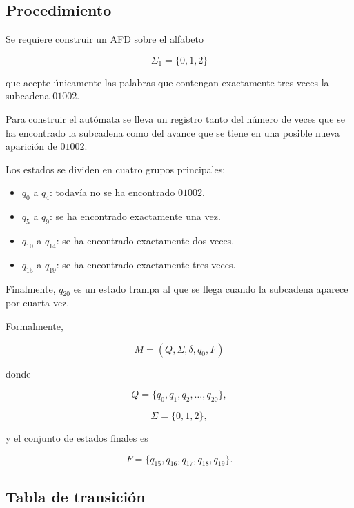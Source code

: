 \documentclass[12pt]{article}
\begin{document}
\subsection*{Procedimiento}

Se requiere construir un AFD sobre el alfabeto

\[
\Sigma_1=\{0,1,2\}
\]

que acepte únicamente las palabras que contengan exactamente tres veces
la subcadena $01002$.

Para construir el autómata se lleva un registro tanto del número de veces
que se ha encontrado la subcadena como del avance que se tiene en una
posible nueva aparición de $01002$.

Los estados se dividen en cuatro grupos principales:

\begin{itemize}
    \item $q_0$ a $q_4$: todavía no se ha encontrado $01002$.
    \item $q_5$ a $q_9$: se ha encontrado exactamente una vez.
    \item $q_{10}$ a $q_{14}$: se ha encontrado exactamente dos veces.
    \item $q_{15}$ a $q_{19}$: se ha encontrado exactamente tres veces.
\end{itemize}

Finalmente, $q_{20}$ es un estado trampa al que se llega cuando la
subcadena aparece por cuarta vez.

Formalmente,

\[
M=(Q,\Sigma,\delta,q_0,F)
\]

donde

\[
Q=\{q_0,q_1,q_2,\ldots,q_{20}\},
\]

\[
\Sigma=\{0,1,2\},
\]

y el conjunto de estados finales es

\[
F=\{q_{15},q_{16},q_{17},q_{18},q_{19}\}.
\]

\subsection*{Tabla de transición}
\end{document}
